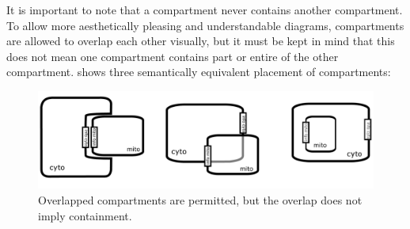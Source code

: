 



It is important to note that a compartment never contains another compartment. To allow more aesthetically pleasing and understandable diagrams, compartments are allowed to overlap each other visually, but it must be kept in mind that this does not mean one compartment contains part or entire of the other compartment.   shows three semantically equivalent placement of compartments:

\begin{figure}[H]
  \centering
  \includegraphics[scale = 0.4]{images/build/compartment_overlapping.pdf}
  \caption{Overlapped compartments are permitted, but the overlap does not imply containment.}
  \label{fig:overlap}
\end{figure}

